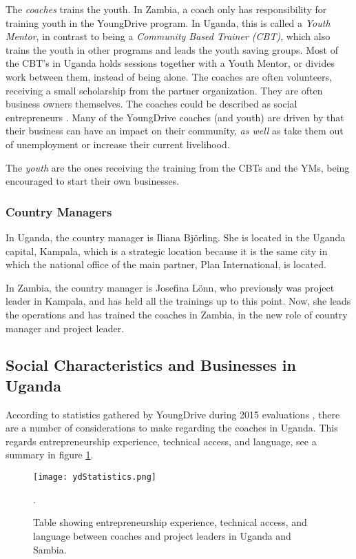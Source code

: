 The \textit{coaches} trains the youth. In Zambia, a coach only has responsibility for training youth in the YoungDrive program. In Uganda, this is called a \textit{Youth Mentor}, in contrast to being a \textit{Community Based Trainer (CBT)}, which also trains the youth in other programs and leads the youth saving groups. Most of the CBT's in Uganda holds sessions together with a Youth Mentor, or divides work between them, instead of being alone. The coaches are often volunteers, receiving a small scholarship from the partner organization. They are often business owners themselves. The coaches could be described as social entrepreneurs \citep{mitchel}. Many of the YoungDrive coaches (and youth) are driven by that their business can have an impact on their community, \textit{as well} as take them out of unemployment or increase their current livelihood.

The \textit{youth} are the ones receiving the training from the CBTs and the YMs, being encouraged to start their own businesses.

\subsubsection{Country Managers}

In Uganda, the country manager is Iliana Björling. She is located in the Uganda capital, Kampala, which is a strategic location because it is the same city in which the national office of the main partner, Plan International, is located.

In Zambia, the country manager is Josefina Lönn, who previously was project leader in Kampala, and has held all the trainings up to this point. Now, she leads the operations and has trained the coaches in Zambia, in the new role of country manager and project leader.

\subsection{Social Characteristics and Businesses in Uganda}

According to statistics gathered by YoungDrive during 2015 evaluations \citep{youngdrive-statistics}, there are a number of considerations to make regarding the coaches in Uganda. This regards entrepreneurship experience, technical access, and language, see a summary in figure \ref{fig:ydStatistics}.

\begin{figure}[h]
    \centering
    \texttt{[image: ydStatistics.png]}
    \caption{Table showing entrepreneurship experience, technical access, and language between coaches and project leaders in Uganda and Sambia.}.
    \label{fig:ydStatistics}
\end{figure}

